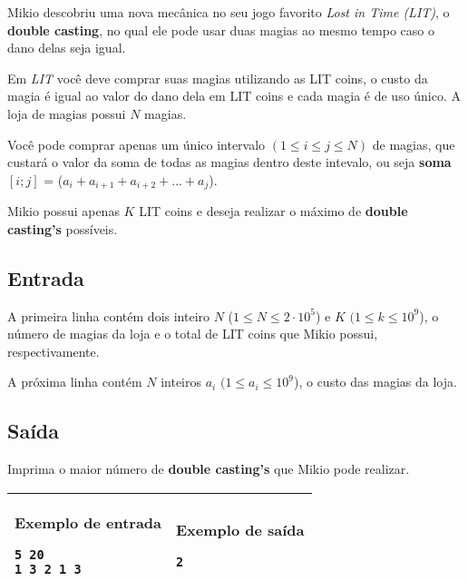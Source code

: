 Mikio descobriu uma nova mecânica no seu jogo favorito \textit{Lost in Time (LIT)}, o \textbf{double casting}, no qual ele pode usar duas magias ao mesmo tempo caso o dano delas seja igual.

Em \textit{LIT} você deve comprar suas magias utilizando as LIT coins, o custo da magia é igual ao valor do dano dela em LIT coins e cada magia é de uso único. A loja de magias possui $N$ magias.

Você pode comprar apenas um único intervalo $(1\leq i \leq j \leq N)$ de magias, que custará o valor da soma de todas as magias dentro deste intevalo, ou seja \textbf{soma}$[i; j]$ = ($a_i + a_{i+1}+ a_{i+2}+ ...+ a_j$).

Mikio possui apenas $K$ LIT coins e deseja realizar o máximo de \textbf{double casting's} possíveis.


\subsection*{Entrada}

A primeira linha contém dois inteiro $N$ ($1 \leq N \leq 2\cdot 10^5$) e $K$ $(1 \leq k \leq 10^9$), o número de magias da loja e o total de LIT coins que Mikio possui, respectivamente.

A próxima linha contém $N$ inteiros $a_i$ $(1 \leq a_i \leq 10^9$), o custo das magias da loja.

\subsection*{Saída}

Imprima o maior número de \textbf{double casting's} que Mikio pode realizar.

\begin{table}[!h]
\centering
\begin{tabular}{|l|l|}
\hline
\begin{minipage}[t]{3in}
\textbf{Exemplo de entrada}
\begin{verbatim}
5 20
1 3 2 1 3
\end{verbatim}
\vspace{1mm}
\end{minipage}
&
\begin{minipage}[t]{3in}
\textbf{Exemplo de saída}
\begin{verbatim}
2
\end{verbatim}
\vspace{1mm}
\end{minipage} \\
\hline
\end{tabular}
\end{table}

